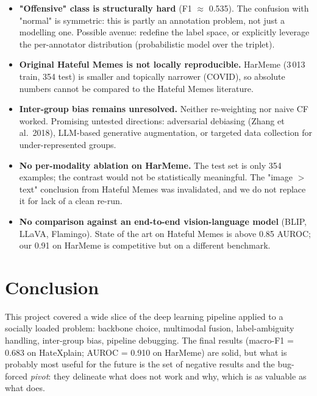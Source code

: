 \documentclass[11pt,a4paper]{article}
\begin{document}
\begin{itemize}[leftmargin=*]
    \item \textbf{"Offensive" class is structurally hard} (F1 $\approx$ 0.535).
    The confusion with "normal" is symmetric: this is partly an annotation problem,
    not just a modelling one. Possible avenue: redefine the label space, or
    explicitly leverage the per-annotator distribution (probabilistic model over
    the triplet).
    \item \textbf{Original Hateful Memes is not locally reproducible.} HarMeme
    (3\,013 train, 354 test) is smaller and topically narrower (COVID), so absolute
    numbers cannot be compared to the Hateful Memes literature.
    \item \textbf{Inter-group bias remains unresolved.} Neither re-weighting nor
    naive CF worked. Promising untested directions: adversarial debiasing
    (Zhang et al.\ 2018), LLM-based generative augmentation, or targeted data
    collection for under-represented groups.
    \item \textbf{No per-modality ablation on HarMeme.} The test set is only 354
    examples; the contrast would not be statistically meaningful. The
    "image $>$ text" conclusion from Hateful Memes was invalidated, and we do
    not replace it for lack of a clean re-run.
    \item \textbf{No comparison against an end-to-end vision-language model}
    (BLIP, LLaVA, Flamingo). State of the art on Hateful Memes is above 0.85
    AUROC; our 0.91 on HarMeme is competitive but on a different benchmark.
\end{itemize}

\section{Conclusion}

This project covered a wide slice of the deep learning pipeline applied to a
socially loaded problem: backbone choice, multimodal fusion, label-ambiguity
handling, inter-group bias, pipeline debugging. The final results (macro-F1 =
0.683 on HateXplain; AUROC = 0.910 on HarMeme) are solid, but what is probably
most useful for the future is the set of negative results and the bug-forced
\emph{pivot}: they delineate what does not work and why, which is as valuable as
what does.

\end{document}

